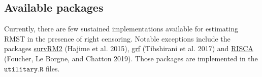 \documentclass[
  11pt,
  a4paper,
]{article}
\newenvironment{Shaded}{}{}
\newcommand{\AttributeTok}[1]{\textcolor[rgb]{0.84,0.23,0.29}{#1}}
\newcommand{\CommentTok}[1]{\textcolor[rgb]{0.42,0.45,0.49}{#1}}
\newcommand{\ConstantTok}[1]{\textcolor[rgb]{0.00,0.36,0.77}{#1}}
\newcommand{\DecValTok}[1]{\textcolor[rgb]{0.00,0.36,0.77}{#1}}
\newcommand{\FunctionTok}[1]{\textcolor[rgb]{0.44,0.26,0.76}{#1}}
\newcommand{\NormalTok}[1]{\textcolor[rgb]{0.14,0.16,0.18}{#1}}
\newcommand{\OtherTok}[1]{\textcolor[rgb]{0.44,0.26,0.76}{#1}}
\newcommand{\SpecialCharTok}[1]{\textcolor[rgb]{0.00,0.36,0.77}{#1}}
\theoremstyle{plain}
\theoremstyle{plain}
\theoremstyle{plain}
\theoremstyle{definition}
\theoremstyle{remark}
\begin{document}
\begin{Shaded}
\end{Shaded}

\subsection{Available packages}\label{sec-package}

Currently, there are few sustained implementations available for
estimating RMST in the presence of right censoring. Notable exceptions
include the packages
\href{https:\%20//cran.r-project.org/web/packages/survRM2/index.html}{survRM2}
(Hajime et al. 2015),
\href{https:\%20//cran.r-project.org/web/packages/grf/index.html}{grf}
(Tibshirani et al. 2017) and
\href{https://cran.r-project.org/web/packages/RISCA/index.html}{RISCA}
(Foucher, Le Borgne, and Chatton 2019). Those packages are implemented
in the \(\texttt{utilitary.R}\) files.
\end{document}
